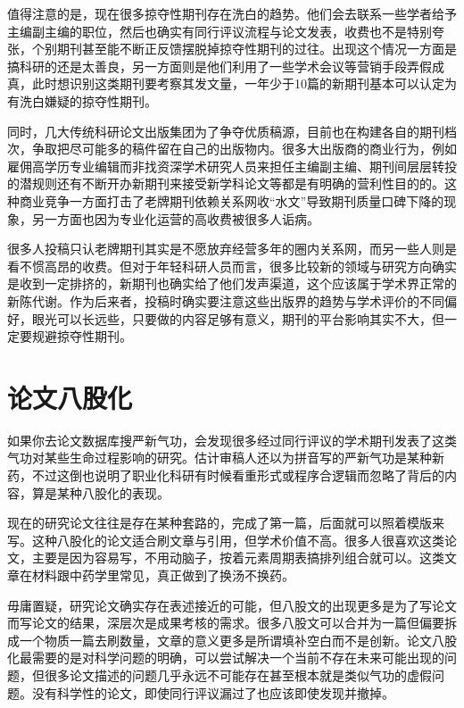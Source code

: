 \documentclass[]{tufte-book}
\begin{document}
值得注意的是，现在很多掠夺性期刊存在洗白的趋势。他们会去联系一些学者给予主编副主编的职位，然后也确实有同行评议流程与论文发表，收费也不是特别夸张，个别期刊甚至能不断正反馈摆脱掉掠夺性期刊的过往。出现这个情况一方面是搞科研的还是太善良，另一方面则是他们利用了一些学术会议等营销手段弄假成真，此时想识别这类期刊要考察其发文量，一年少于10篇的新期刊基本可以认定为有洗白嫌疑的掠夺性期刊。

同时，几大传统科研论文出版集团为了争夺优质稿源，目前也在构建各自的期刊档次，争取把尽可能多的稿件留在自己的出版物内。很多大出版商的商业行为，例如雇佣高学历专业编辑而非找资深学术研究人员来担任主编副主编、期刊间层层转投的潜规则还有不断开办新期刊来接受新学科论文等都是有明确的营利性目的的。这种商业竞争一方面打击了老牌期刊依赖关系网收``水文''导致期刊质量口碑下降的现象，另一方面也因为专业化运营的高收费被很多人诟病。

很多人投稿只认老牌期刊其实是不愿放弃经营多年的圈内关系网，而另一些人则是看不惯高昂的收费。但对于年轻科研人员而言，很多比较新的领域与研究方向确实是收到一定排挤的，新期刊也确实给了他们发声渠道，这个应该属于学术界正常的新陈代谢。作为后来者，投稿时确实要注意这些出版界的趋势与学术评价的不同偏好，眼光可以长远些，只要做的内容足够有意义，期刊的平台影响其实不大，但一定要规避掠夺性期刊。

\hypertarget{ux8bbaux6587ux516bux80a1ux5316}{%
\section{论文八股化}\label{ux8bbaux6587ux516bux80a1ux5316}}

如果你去论文数据库搜严新气功，会发现很多经过同行评议的学术期刊发表了这类气功对某些生命过程影响的研究。估计审稿人还以为拼音写的严新气功是某种新药，不过这倒也说明了职业化科研有时候看重形式或程序合逻辑而忽略了背后的内容，算是某种八股化的表现。

现在的研究论文往往是存在某种套路的，完成了第一篇，后面就可以照着模版来写。这种八股化的论文适合刷文章与引用，但学术价值不高。很多人很喜欢这类论文，主要是因为容易写，不用动脑子，按着元素周期表搞排列组合就可以。这类文章在材料跟中药学里常见，真正做到了换汤不换药。

毋庸置疑，研究论文确实存在表述接近的可能，但八股文的出现更多是为了写论文而写论文的结果，深层次是成果考核的需求。很多八股文可以合并为一篇但偏要拆成一个物质一篇去刷数量，文章的意义更多是所谓填补空白而不是创新。论文八股化最需要的是对科学问题的明确，可以尝试解决一个当前不存在未来可能出现的问题，但很多论文描述的问题几乎永远不可能存在甚至根本就是类似气功的虚假问题。没有科学性的论文，即使同行评议漏过了也应该即使发现并撤掉。
\end{document}
